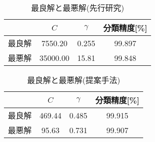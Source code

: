 \clearpage
\begin{table}[tb]
  \centering
  \caption{最良解と最悪解(先行研究)}  %
  \begin{tabular}{|c|c|c|c|}  %
      \hline  %
      &$C$ &$\gamma$ &分類精度[\%] \\  %
      \hline  %
    最良解 &7550.20& 0.255&99.897 \\  %
      \hline  %
    最悪解  &35000.00&15.81 &99.848\\  %
      \hline  %
  \end{tabular}
  \label{myparam2}  %
\end{table}
\begin{table}[tb]
  \centering
  \caption{最良解と最悪解(提案手法)}  %
  \begin{tabular}{|c|c|c|c|}  %
      \hline  %
      &$C$ &$\gamma$ &分類精度[\%] \\  %
      \hline  %
    最良解&469.44&0.485&99.915\\  %
      \hline  %
    最悪解 &95.63 &0.731&99.907\\  %
      \hline  %
  \end{tabular}
  \label{myparam1}  %
\end{table}

